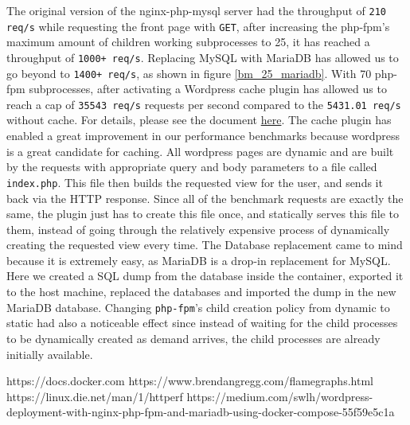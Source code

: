The original version of the nginx-php-mysql server had the throughput of \texttt{210 req/s} while requesting the front page with \texttt{GET}, after increasing the php-fpm's maximum amount of children working subprocesses to 25, it has reached a throughput of \texttt{1000+ req/s}.
Replacing MySQL with MariaDB has allowed us to go beyond to \texttt{1400+ req/s}, as shown in figure \ref{bm_25_mariadb}. With 70 php-fpm subprocesses, after activating a Wordpress cache plugin has allowed us to reach a cap of \texttt{35543 req/s} requests per second compared to the \texttt{5431.01 req/s} without cache. For details, please see the document \href{https://github.com/danbachar/swiss-knife/blob/master/task1/benchmark/optimization.md}{here}. 
\newline
The cache plugin has enabled a great improvement in our performance benchmarks because wordpress is a great candidate for caching. All wordpress pages are dynamic and are built by the requests with appropriate query and body parameters to a file called \texttt{index.php}. This file then builds the requested view for the user, and sends it back via the HTTP response. Since all of the benchmark requests are exactly the same, the plugin just has to create this file once, and statically serves this file to them, instead of going through the relatively expensive process of dynamically creating the requested view every time.
\newline
The Database replacement came to mind because it is extremely easy, as MariaDB is a drop-in replacement for MySQL. Here we created a SQL dump from the database inside the container, exported it to the host machine, replaced the databases and imported the dump in the new MariaDB database.
\newline
Changing \texttt{php-fpm}'s child creation policy from dynamic to static had also a noticeable effect since instead of waiting for the child processes to be dynamically created as demand arrives, the child processes are already initially available. 


\begin{thebibliography}{99}  
https://docs.docker.com
https://www.brendangregg.com/flamegraphs.html
https://linux.die.net/man/1/httperf
https://medium.com/swlh/wordpress-deployment-with-nginx-php-fpm-and-mariadb-using-docker-compose-55f59e5c1a
\end{thebibliography}


